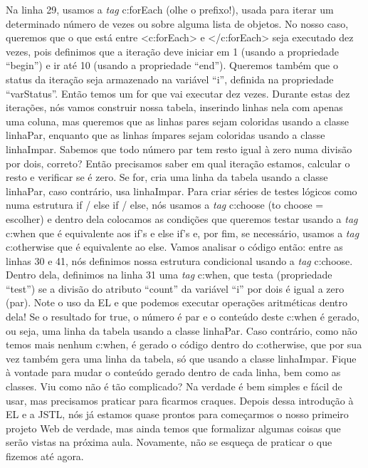 Na linha 29, usamos a \textit{tag} c:forEach (olhe o prefixo!), usada para iterar um determinado número de vezes ou sobre alguma lista de objetos. No nosso caso, queremos que o que está entre <c:forEach> e </c:forEach> seja executado dez vezes, pois definimos que a iteração deve iniciar em 1 (usando a propriedade ``begin'') e ir até 10 (usando a propriedade ``end''). Queremos também que o status da iteração seja armazenado na variável ``i'', definida na propriedade ``varStatus''. Então temos um for que vai executar dez vezes. Durante estas dez iterações, nós vamos construir nossa tabela, inserindo linhas nela com apenas uma coluna, mas queremos que as linhas pares sejam coloridas usando a classe linhaPar, enquanto que as linhas ímpares sejam coloridas usando a classe linhaImpar. Sabemos que todo número par tem resto igual à zero numa divisão por dois, correto? Então precisamos saber em qual iteração estamos, calcular o resto e verificar se é zero. Se for, cria uma linha da tabela usando a classe linhaPar, caso contrário, usa linhaImpar.
Para criar séries de testes lógicos como numa estrutura if / else if / else, nós usamos a \textit{tag} c:choose (to choose = escolher) e dentro dela colocamos as condições que queremos testar usando a \textit{tag} c:when que é equivalente aos if’s e else if’s e, por fim, se necessário, usamos a \textit{tag} c:otherwise que é equivalente ao else. Vamos analisar o código então: entre as linhas 30 e 41, nós definimos nossa estrutura condicional usando a \textit{tag} c:choose. Dentro dela, definimos na linha 31 uma \textit{tag} c:when, que testa (propriedade ``test'') se a divisão do atributo ``count'' da variável ``i'' por dois é igual a zero (par). Note o uso da EL e que podemos executar operações aritméticas dentro dela! Se o resultado for true, o número é par e o conteúdo deste c:when é gerado, ou seja, uma linha da tabela usando a classe linhaPar. Caso contrário, como não temos mais nenhum c:when, é gerado o código dentro do c:otherwise, que por sua vez também gera uma linha da tabela, só que usando a classe linhaImpar. Fique à vontade para mudar o conteúdo gerado dentro de cada linha, bem como as classes.
Viu como não é tão complicado? Na verdade é bem simples e fácil de usar, mas precisamos praticar para ficarmos craques. Depois dessa introdução à EL e a JSTL, nós já estamos quase prontos para começarmos o nosso primeiro projeto Web de verdade, mas ainda temos que formalizar algumas coisas que serão vistas na próxima aula. Novamente, não se esqueça de praticar o que fizemos até agora.  


